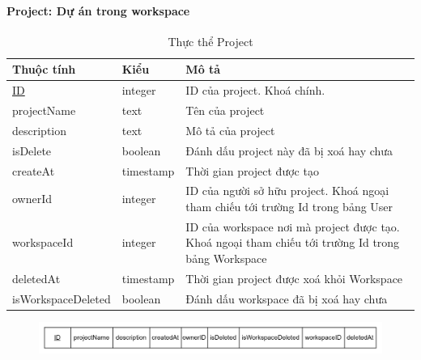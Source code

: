 \paragraph{Project: Dự án trong workspace}
\begin{center}
\begin{table}[!h]
        \begin{tabular}{ |p{4cm} |p{3cm} |p{7cm}|} 
                \hline
                   Thuộc tính & Kiểu & Mô tả \\ [0.5ex] 
                \hline
                \underline{ID} & integer & ID của project. Khoá chính. \\ 
                \hline
                projectName & text & Tên của project \\
                \hline
                description & text & Mô tả của project \\
                \hline
                isDelete & boolean & Đánh dấu project này đã bị xoá hay chưa \\
                \hline
                createAt & timestamp & Thời gian project được tạo \\
                \hline
                ownerId & integer & ID của người sở hữu project.
                Khoá ngoại tham chiếu tới trường Id trong bảng User \\
                \hline
                workspaceId & integer & ID của workspace nơi mà project được tạo. Khoá ngoại tham chiếu tới trường Id trong bảng Workspace \\
                \hline
                deletedAt & timestamp & Thời gian project được xoá khỏi Workspace \\
                \hline
                isWorkspaceDeleted & boolean & Đánh dấu workspace đã bị xoá hay chưa \\
                \hline
               \end{tabular}

                        \caption{Thực thể Project}
\end{table}
\end{center}
\begin{figure}[H]
        \centering
        \includegraphics[width=\textwidth]{Content/Phân tích và thiết kế hệ thống/images/ERD_mapping/project_mapping.png}
        \label{fig:Thực thể Project}
\end{figure}

